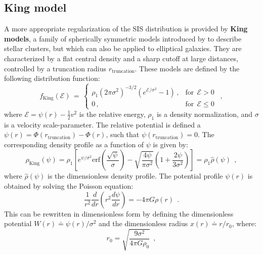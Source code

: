 \documentclass[fleqn,usenatbib]{mnras}
\begin{document}
\subsection{King model}\label{sec:King_model}
A more appropriate regularization of the SIS distribution is provided by \textbf{King models}, a family of spherically symmetric models introduced by \cite{King1966} to describe stellar clusters, but which can also be applied to elliptical galaxies.
They are characterized by a flat central density and a sharp cutoff at large distances, controlled by a truncation radius $r_\text{truncation}$.
These models are defined by the following distribution function:
\begin{equation}
    f_\text{King}(\mathcal{E}) \, = \, 
    \begin{cases}
      \rho_1 \left(2 \pi \sigma^2\right)^{-3/2} \left(e^{\mathcal{E}/\sigma^2} - 1\right) \, , &\text{for}\:\:\mathcal{E}>0\\
      0 \, , &\text{for}\:\:\mathcal{E} \leq 0
    \end{cases} \:\: ,
    \label{eq:king_distribution_function}
\end{equation}
where $\mathcal{E} = \psi(r) - \frac{1}{2} v^2$ is the relative energy, $\rho_1$ is a density normalization, and $\sigma$ is a velocity scale-parameter.
The relative potential is defined a $\psi(r) = \Phi(r_\text{truncation}) - \Phi(r)$, such that $\psi(r_\text{truncation}) = 0$.
The corresponding density profile as a function of $\psi$ is given by:
{\fontsize{8.1pt}{8.1pt}\begin{equation}
    \rho_\text{King}(\psi) = \rho_1 \left[ e^{\psi/\sigma^2} \text{erf}\left(\dfrac{\sqrt{\psi}}{\sigma}\right) - \sqrt{\dfrac{4 \psi}{\pi \sigma^2}} \left(1+\dfrac{2 \psi}{3 \sigma^2}\right) \right] = \rho_1 \hat{\rho}(\psi) \:\:,
    \label{eq:king_density}
\end{equation}}
where $\hat{\rho}(\psi)$ is the dimensionless density profile.
The potential profile $\psi(r)$ is obtained by solving the Poisson equation:
\begin{equation}
    \dfrac{1}{r^2} \dfrac{d}{dr} \left(r^2 \dfrac{d\psi}{dr}\right) = -4 \pi G \rho(r) \:\: .
    \label{eq:king_poisson}
\end{equation}
This can be rewritten in dimensionless form by defining the dimensionless potential $W(r) \doteq \psi(r)/\sigma^2$ and the dimensionless radius $x(r) \doteq r/r_0$, where:
\begin{equation}
     r_0 = \sqrt{\dfrac{9 \sigma^2}{4 \pi G \rho_0}} \:\:,
    \label{eq:king_r0}
\end{equation}
\end{document}
